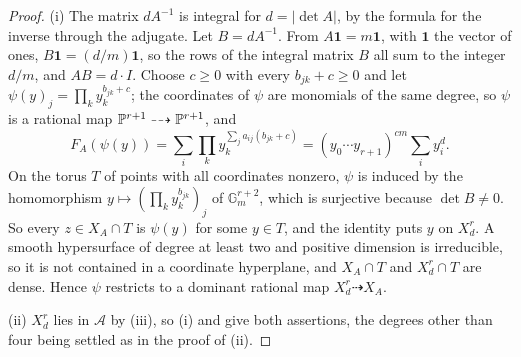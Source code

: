 \begin{proof}
(i) The matrix $dA^{-1}$ is integral for $d=|\det A|$, by the formula
for the inverse through the adjugate. Let $B=dA^{-1}$. From
$A\mathbf{1}=m\mathbf{1}$, with $\mathbf{1}$ the vector of ones,
$B\mathbf{1}=(d/m)\mathbf{1}$, so the rows of the integral matrix $B$ all
sum to the integer $d/m$, and $AB=d\cdot I$. Choose $c\ge0$
with every $b_{jk}+c\ge0$ and let $\psi(y)_{j}=\prod_{k}y_{k}^{b_{jk}+c}$;
the coordinates of $\psi$ are monomials of the same degree, so $\psi$ is a
rational map $\mathbb{P}^{r+1}\dashrightarrow\mathbb{P}^{r+1}$, and
\[
  F_{A}(\psi(y))=\sum_{i}\prod_{k}y_{k}^{\sum_{j}a_{ij}(b_{jk}+c)}
  =(y_{0}\cdots y_{r+1})^{cm}\sum_{i}y_{i}^{d}.
\]
On the torus $T$ of points with all coordinates nonzero, $\psi$ is induced
by the homomorphism $y\mapsto(\prod_{k}y_{k}^{b_{jk}})_{j}$ of
$\mathbb{G}_{m}^{r+2}$, which is surjective because $\det B\ne0$. So every
$z\in X_{A}\cap T$ is $\psi(y)$ for some $y\in T$, and the identity puts $y$
on $X^{r}_{d}$. A smooth hypersurface of degree at least two and positive
dimension is irreducible, so it is not contained in a coordinate hyperplane,
and $X_{A}\cap T$ and $X^{r}_{d}\cap T$ are dense. Hence $\psi$ restricts to
a dominant rational map $X^{r}_{d}\dashrightarrow X_{A}$.

(ii) $X^{r}_{d}$ lies in $\mathcal{A}$ by (iii), so (i)
and  give both assertions, the degrees other than
four being settled as in the proof of (ii).


\end{proof}
